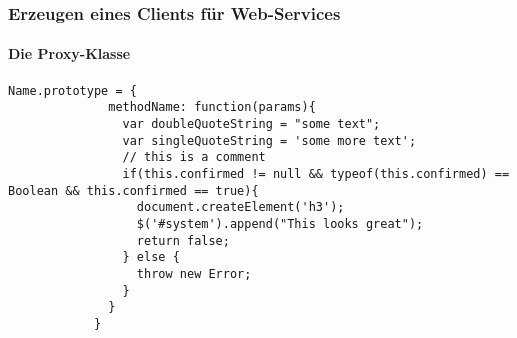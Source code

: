 \begin{frame}[fragile]
	\frametitle{Erzeugen eines Clients für Web-Services}
	\framesubtitle{Die Proxy-Klasse}
			\begin{lstlisting}[caption=My Javascript Example]
			Name.prototype = {
			  methodName: function(params){
			    var doubleQuoteString = "some text";
			    var singleQuoteString = 'some more text';
			    // this is a comment
			    if(this.confirmed != null && typeof(this.confirmed) == Boolean && this.confirmed == true){
			      document.createElement('h3');
			      $('#system').append("This looks great");
			      return false;
			    } else {
			      throw new Error;
			    }
			  }
			}
			\end{lstlisting}
\end{frame}